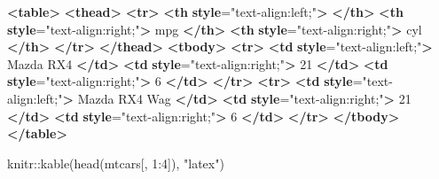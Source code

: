 \documentclass[
  11pt,
  lualatex,ja=standard,jafont=noto]{bxjsreport}
\newenvironment{Shaded}{\begin{snugshade}}{\end{snugshade}}
\newcommand{\DecValTok}[1]{\textcolor[rgb]{0.00,0.00,0.81}{#1}}
\newcommand{\ErrorTok}[1]{\textcolor[rgb]{0.64,0.00,0.00}{\textbf{#1}}}
\newcommand{\FunctionTok}[1]{\textcolor[rgb]{0.00,0.00,0.00}{#1}}
\newcommand{\KeywordTok}[1]{\textcolor[rgb]{0.13,0.29,0.53}{\textbf{#1}}}
\newcommand{\NormalTok}[1]{#1}
\newcommand{\OtherTok}[1]{\textcolor[rgb]{0.56,0.35,0.01}{#1}}
\newcommand{\SpecialCharTok}[1]{\textcolor[rgb]{0.00,0.00,0.00}{#1}}
\newcommand{\StringTok}[1]{\textcolor[rgb]{0.31,0.60,0.02}{#1}}
\begin{document}
\begin{Shaded}
\begin{Highlighting}[]
\KeywordTok{\textless{}table\textgreater{}}
 \KeywordTok{\textless{}thead\textgreater{}}
  \KeywordTok{\textless{}tr\textgreater{}}
   \KeywordTok{\textless{}th} \ErrorTok{style}\OtherTok{=}\StringTok{"text{-}align:left;"}\KeywordTok{\textgreater{}}   \KeywordTok{\textless{}/th\textgreater{}}
   \KeywordTok{\textless{}th} \ErrorTok{style}\OtherTok{=}\StringTok{"text{-}align:right;"}\KeywordTok{\textgreater{}}\NormalTok{ mpg }\KeywordTok{\textless{}/th\textgreater{}}
   \KeywordTok{\textless{}th} \ErrorTok{style}\OtherTok{=}\StringTok{"text{-}align:right;"}\KeywordTok{\textgreater{}}\NormalTok{ cyl }\KeywordTok{\textless{}/th\textgreater{}}
  \KeywordTok{\textless{}/tr\textgreater{}}
 \KeywordTok{\textless{}/thead\textgreater{}}
\KeywordTok{\textless{}tbody\textgreater{}}
  \KeywordTok{\textless{}tr\textgreater{}}
   \KeywordTok{\textless{}td} \ErrorTok{style}\OtherTok{=}\StringTok{"text{-}align:left;"}\KeywordTok{\textgreater{}}\NormalTok{ Mazda RX4 }\KeywordTok{\textless{}/td\textgreater{}}
   \KeywordTok{\textless{}td} \ErrorTok{style}\OtherTok{=}\StringTok{"text{-}align:right;"}\KeywordTok{\textgreater{}}\NormalTok{ 21 }\KeywordTok{\textless{}/td\textgreater{}}
   \KeywordTok{\textless{}td} \ErrorTok{style}\OtherTok{=}\StringTok{"text{-}align:right;"}\KeywordTok{\textgreater{}}\NormalTok{ 6 }\KeywordTok{\textless{}/td\textgreater{}}
  \KeywordTok{\textless{}/tr\textgreater{}}
  \KeywordTok{\textless{}tr\textgreater{}}
   \KeywordTok{\textless{}td} \ErrorTok{style}\OtherTok{=}\StringTok{"text{-}align:left;"}\KeywordTok{\textgreater{}}\NormalTok{ Mazda RX4 Wag }\KeywordTok{\textless{}/td\textgreater{}}
   \KeywordTok{\textless{}td} \ErrorTok{style}\OtherTok{=}\StringTok{"text{-}align:right;"}\KeywordTok{\textgreater{}}\NormalTok{ 21 }\KeywordTok{\textless{}/td\textgreater{}}
   \KeywordTok{\textless{}td} \ErrorTok{style}\OtherTok{=}\StringTok{"text{-}align:right;"}\KeywordTok{\textgreater{}}\NormalTok{ 6 }\KeywordTok{\textless{}/td\textgreater{}}
  \KeywordTok{\textless{}/tr\textgreater{}}
\KeywordTok{\textless{}/tbody\textgreater{}}
\KeywordTok{\textless{}/table\textgreater{}}
\end{Highlighting}
\end{Shaded}

\begin{Shaded}
\begin{Highlighting}[numbers=left,,]
\NormalTok{knitr}\SpecialCharTok{::}\FunctionTok{kable}\NormalTok{(}\FunctionTok{head}\NormalTok{(mtcars[, }\DecValTok{1}\SpecialCharTok{:}\DecValTok{4}\NormalTok{]), }\StringTok{"latex"}\NormalTok{)}
\end{Highlighting}
\end{Shaded}
\end{document}
